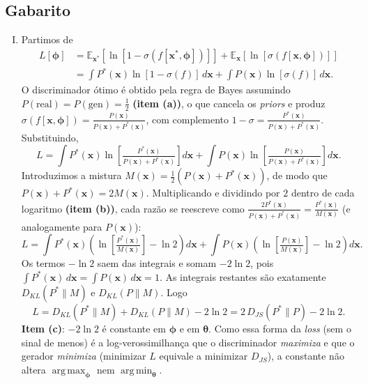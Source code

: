 \documentclass{dlproblemset}
\newcommand{\thetav}{\boldsymbol{\theta}}
\DeclareMathOperator*{\argmax}{arg\,max}
\DeclareMathOperator*{\argmin}{arg\,min}
\begin{document}
\subsection*{Gabarito}
\color{blue}
\begin{enumerate}[I)]
    \item Partimos de
    \begin{align*}
      L[\boldsymbol{\phi}] &= \mathbb{E}_{\mathbf{x}^{*}}\!\left[\ln[1 - \sigma(f[\mathbf{x}^{*},\boldsymbol{\phi}])]\right]
              + \mathbb{E}_{\mathbf{x}}\!\left[\ln[\sigma(f[\mathbf{x},\boldsymbol{\phi}])]\right] \\
              &= \int P^{*}(\mathbf{x})\ln[1 - \sigma(f)]\,d\mathbf{x} + \int P(\mathbf{x})\ln[\sigma(f)]\,d\mathbf{x}.
    \end{align*}
    O discriminador ótimo é obtido pela regra de Bayes assumindo $P(\text{real}) = P(\text{gen}) = \tfrac{1}{2}$ \textbf{(item (a))}, o que cancela os \emph{priors} e produz $\sigma(f[\mathbf{x},\boldsymbol{\phi}]) = \tfrac{P(\mathbf{x})}{P(\mathbf{x}) + P^{*}(\mathbf{x})}$, com complemento $1 - \sigma = \tfrac{P^{*}(\mathbf{x})}{P(\mathbf{x}) + P^{*}(\mathbf{x})}$. Substituindo,
    \[
      L = \int P^{*}(\mathbf{x})\ln\!\left[\tfrac{P^{*}(\mathbf{x})}{P(\mathbf{x}) + P^{*}(\mathbf{x})}\right]d\mathbf{x} + \int P(\mathbf{x})\ln\!\left[\tfrac{P(\mathbf{x})}{P(\mathbf{x}) + P^{*}(\mathbf{x})}\right]d\mathbf{x}.
    \]
    Introduzimos a mistura $M(\mathbf{x}) = \tfrac{1}{2}(P(\mathbf{x}) + P^{*}(\mathbf{x}))$, de modo que $P(\mathbf{x}) + P^{*}(\mathbf{x}) = 2M(\mathbf{x})$. Multiplicando e dividindo por $2$ dentro de cada logaritmo \textbf{(item (b))}, cada razão se reescreve como $\tfrac{2P^{*}(\mathbf{x})}{P(\mathbf{x}) + P^{*}(\mathbf{x})} = \tfrac{P^{*}(\mathbf{x})}{M(\mathbf{x})}$ (e analogamente para $P(\mathbf{x})$):
    \[
      L = \int P^{*}(\mathbf{x})\!\left(\ln\!\left[\tfrac{P^{*}(\mathbf{x})}{M(\mathbf{x})}\right] - \ln 2\right)d\mathbf{x}
        + \int P(\mathbf{x})\!\left(\ln\!\left[\tfrac{P(\mathbf{x})}{M(\mathbf{x})}\right] - \ln 2\right)d\mathbf{x}.
    \]
    Os termos $-\ln 2$ saem das integrais e somam $-2\ln 2$, pois $\int P^{*}(\mathbf{x})\,d\mathbf{x} = \int P(\mathbf{x})\,d\mathbf{x} = 1$. As integrais restantes são exatamente $D_{KL}(P^{*}\|M)$ e $D_{KL}(P\|M)$. Logo
    \[
      L = D_{KL}(P^{*}\|M) + D_{KL}(P\|M) - 2\ln 2 = 2\,D_{JS}(P^{*}\|P) - 2\ln 2.
    \]
    \textbf{Item (c)}: $-2\ln 2$ é constante em $\boldsymbol{\phi}$ e em $\thetav$. Como essa forma da \emph{loss} (sem o sinal de menos) é a log-verossimilhança que o discriminador \emph{maximiza} e que o gerador \emph{minimiza} (minimizar $L$ equivale a minimizar $D_{JS}$), a constante não altera $\argmax_{\boldsymbol{\phi}}$ nem $\argmin_{\thetav}$.


\end{enumerate}
\end{document}
